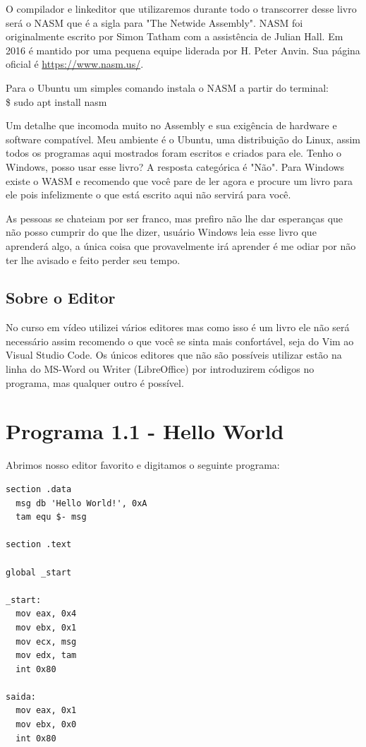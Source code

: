 O compilador e linkeditor que utilizaremos durante todo o transcorrer desse livro será o NASM que é a sigla para "The Netwide Assembly". NASM foi originalmente escrito por Simon Tatham com a assistência de Julian Hall. Em 2016 é mantido por uma pequena equipe liderada por H. Peter Anvin. Sua página oficial é \url{https://www.nasm.us/}.

Para o Ubuntu um simples comando instala o NASM a partir do terminal:\\
{\ttfamily\$ sudo apt install nasm}
\\[2mm]
\begin{dica}
	Um detalhe que incomoda muito no Assembly e sua exigência de hardware e software compatível. Meu ambiente é o Ubuntu, uma distribuição do Linux, assim todos os programas aqui mostrados foram escritos e criados para ele. Tenho o Windows, posso usar esse livro? A resposta categórica é "Não". Para Windows existe o WASM e recomendo que você pare de ler agora e procure um livro para ele pois infelizmente o que está escrito aqui não servirá para você.
\end{dica}

As pessoas se chateiam por ser franco, mas prefiro não lhe dar esperanças que não posso cumprir do que lhe dizer, usuário Windows leia esse livro que aprenderá algo, a única coisa que provavelmente irá aprender é me odiar por não ter lhe avisado e feito perder seu tempo.

\subsection{Sobre o Editor}

No curso em vídeo utilizei vários editores mas como isso é um livro ele não será necessário assim recomendo o que você se sinta mais confortável, seja do Vim ao Visual Studio Code. Os únicos editores que não são possíveis utilizar estão na linha do MS-Word ou Writer (LibreOffice) por introduzirem códigos no programa, mas qualquer outro é possível.

\section{Programa 1.1 - Hello World}
Abrimos nosso editor favorito e digitamos o seguinte programa:
\begin{lstlisting}[]
section .data
  msg db 'Hello World!', 0xA
  tam equ $- msg

section .text

global _start

_start:
  mov eax, 0x4
  mov ebx, 0x1
  mov ecx, msg
  mov edx, tam
  int 0x80

saida:
  mov eax, 0x1
  mov ebx, 0x0
  int 0x80
\end{lstlisting}

